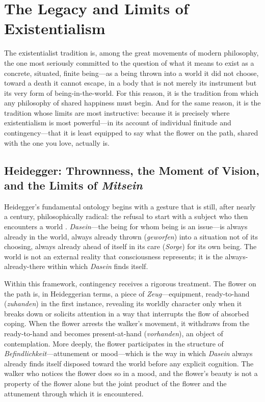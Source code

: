 \section{The Legacy and Limits of Existentialism}
\label{p14:sec:existentialism}

\noindent
The existentialist tradition is, among the great movements of modern philosophy, the one most seriously committed to the question of what it means to exist as a concrete, situated, finite being---as a being thrown into a world it did not choose, toward a death it cannot escape, in a body that is not merely its instrument but its very form of being-in-the-world. For this reason, it is the tradition from which any philosophy of shared happiness must begin. And for the same reason, it is the tradition whose limits are most instructive: because it is precisely where existentialism is most powerful---in its account of individual finitude and contingency---that it is least equipped to say what the flower on the path, shared with the one you love, actually is.

\subsection{Heidegger: Thrownness, the Moment of Vision, and the Limits of \emph{Mitsein}}
\label{p14:subsec:heidegger}

\noindent
Heidegger's fundamental ontology begins with a gesture that is still, after nearly a century, philosophically radical: the refusal to start with a subject who then encounters a world \parencite{heidegger1962}. \emph{Dasein}---the being for whom being is an issue---is always already in the world, always already thrown (\emph{geworfen}) into a situation not of its choosing, always already ahead of itself in its care (\emph{Sorge}) for its own being. The world is not an external reality that consciousness represents; it is the always-already-there within which \emph{Dasein} finds itself.

Within this framework, contingency receives a rigorous treatment. The flower on the path is, in Heideggerian terms, a piece of \emph{Zeug}---equipment, ready-to-hand (\emph{zuhanden}) in the first instance, revealing its worldly character only when it breaks down or solicits attention in a way that interrupts the flow of absorbed coping. When the flower arrests the walker's movement, it withdraws from the ready-to-hand and becomes present-at-hand (\emph{vorhanden}), an object of contemplation. More deeply, the flower participates in the structure of \emph{Befindlichkeit}---attunement or mood---which is the way in which \emph{Dasein} always already finds itself disposed toward the world before any explicit cognition. The walker who notices the flower does so in a mood, and the flower's beauty is not a property of the flower alone but the joint product of the flower and the attunement through which it is encountered.

